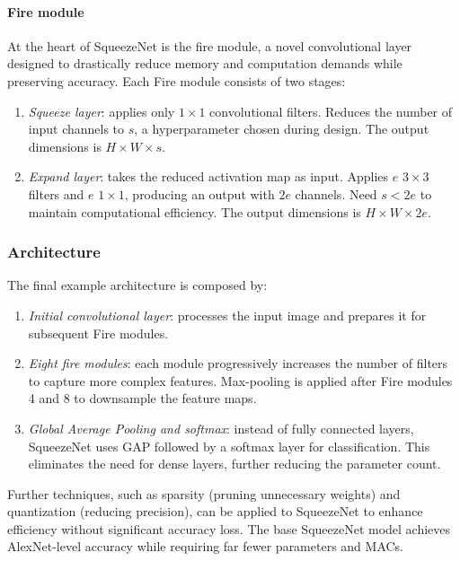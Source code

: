 \paragraph*{Fire module}
At the heart of SqueezeNet is the fire module, a novel convolutional layer designed to drastically reduce memory and computation demands while preserving accuracy. 
Each Fire module consists of two stages:
\begin{enumerate}
    \item \textit{Squeeze layer}: applies only $1\times 1$ convolutional filters. 
        Reduces the number of input channels to $s$, a hyperparameter chosen during design.
        The output dimensions is $H\times W \times s$. 
    \item \textit{Expand layer}: takes the reduced activation map as input.
        Applies $e$ $3\times 3$ filters and $e$ $1\times 1$, producing an output with $2e$ channels. 
        Need $s<2e$ to maintain computational efficiency.
        The output dimensions is $H\times W \times 2e$. 
\end{enumerate}

\subsubsection{Architecture}
The final example architecture is composed by: 
\begin{enumerate}
    \item \textit{Initial convolutional layer}: processes the input image and prepares it for subsequent Fire modules.
    \item \textit{Eight fire modules}: each module progressively increases the number of filters to capture more complex features.
        Max-pooling is applied after Fire modules 4 and 8 to downsample the feature maps.
    \item \textit{Global Average Pooling and softmax}: instead of fully connected layers, SqueezeNet uses GAP followed by a softmax layer for classification.
        This eliminates the need for dense layers, further reducing the parameter count.
\end{enumerate}
\noindent Further techniques, such as sparsity (pruning unnecessary weights) and quantization (reducing precision), can be applied to SqueezeNet to enhance efficiency without significant accuracy loss. 
The base SqueezeNet model achieves AlexNet-level accuracy while requiring far fewer parameters and MACs.

